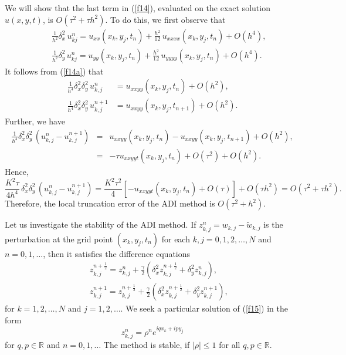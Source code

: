 We will show that the last term in
(\ref{f14}), evaluated on the exact solution $u(x,y,t)$, is $O(\tau^2+\tau h^2)$. To do this, we first observe that
\begin{eqnarray}
&&\frac{1}{h^2}\delta_{x}^2 \, u_{kj}^n=u_{xx}(x_k,y_j,t_n)
+\frac{h^2}{12} \, u_{xxxx}(x_k,y_j,t_n)+O(h^4), \nonumber \\
&&\frac{1}{h^2}\delta_{y}^2 \, u_{kj}^n=u_{yy}(x_k,y_j,t_n)
+\frac{h^2}{12} \, u_{yyyy}(x_k,y_j,t_n)+O(h^4). \label{f14a}
\end{eqnarray}
It follows from (\ref{f14a}) that
\[\begin{split}
\frac{1}{h^4}\delta^2_{x}\delta^2_{y}\, u^{n}_{k,j}&=u_{xxyy}(x_k,y_j,t_n)
+O(h^2), \\
\frac{1}{h^4}\delta^2_{x}\delta^2_{y}\, u^{n+1}_{k,j}&=u_{xxyy}(x_k,y_j,t_{n+1})
+O(h^2).
\end{split}\]
Further, we have
\begin{eqnarray}
\frac{1}{h^4}\delta^2_{x}\delta^2_{y}\, \left( u^{n}_{k,j}-u^{n+1}_{k,j}\right) &=& u_{xxyy}(x_k,y_j,t_n)-u_{xxyy}(x_k,y_j,t_{n+1})
+O(h^2), \nonumber \\
&=&-\tau u_{xxyyt}(x_k,y_j,t_n) +O(\tau^2)+O(h^2). \label{ff14c}
\end{eqnarray}
Hence,
\[
\frac{K^2\tau}{4h^4} \, \delta^2_{x}\delta^2_{y}\, \left(u^{n}_{k,j}-u^{n+1}_{k,j}\right)=
\frac{K^2\tau^2}{4}\left[-u_{xxyyt}(x_k,y_j,t_n)+O(\tau)\right]+O(\tau h^2)=O(\tau^2+\tau h^2).
\]
Therefore, the local truncation error
of the ADI method is $O(\tau^2+h^2)$.

\vskip 0.5cm
 
Let us investigate the stability of the ADI method. If
$z^{n}_{k,j}=w_{k,j}-\tilde{w}_{k,j}$ is
the perturbation at the grid point $(x_{k}, y_{j}, t_{n})$ for each $k,j=0,1,2, \dots, N$
and $n=0,1, \dots$, then it satisfies the difference equations
\begin{eqnarray}
&&z^{n+\frac{1}{2}}_{k,j}=z^{n}_{k,j}+\frac{\gamma}{2}
\left(\delta^2_{x}z^{n+\frac{1}{2}}_{k,j}
+\delta^2_{y}z^{n}_{k,j}\right), \nonumber \\
&&z^{n+1}_{k,j}=z^{n+\frac{1}{2}}_{k,j}+\frac{\gamma}{2}
\left(\delta^2_{x}z^{n+\frac{1}{2}}_{k,j}
+\delta^2_{y}z^{n+1}_{k,j}\right), \label{f15}
\end{eqnarray}
for $k=1,2, \dots, N$ and $j=1, 2, \dots$. We seek a particular solution of
(\ref{f15}) in the form
\[
z^{n}_{k,j}=\rho^{n}e^{iqx_{k}+ipy_{j}}
\]
for $q,p\in{\mathbb R}$ and $n=0,1,\dots$
The method is stable, if $\vert\rho\vert\leq 1$ for all $q,p\in{\mathbb R}$.

